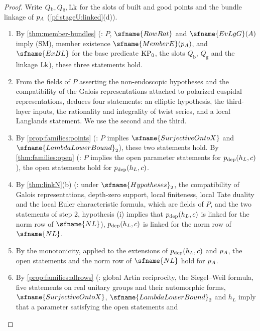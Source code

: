 \begin{proof}
Write $Q_{\mathrm b},Q_{\mathrm g},\mathrm{Lk}$ for the slots of built and good points and the bundle linkage of $p_{A}$
(\cref{pf:stageU:linked}(d)).
\begin{enumerate}[label=\arabic*.]
\item By \cref{thm:member-bundles} (: $P$,
$\sfname{RowRat}$ and $\sfname{EvLgG}(A)$ imply (SM), member existence $\sfname{MemberE}(\stageUpA)$, and $\sfname{ExBL}$
for the base predicate $\mathrm{KP}_0$, the slots $Q_{\mathrm b}$, $Q_{\mathrm g}$ and the linkage $\mathrm{Lk}$), these three
statements hold.
\item From the fields of $P$ asserting the non-endoscopic hypotheses and the compatibility of the Galois representations
attached to polarized cuspidal representations, 
deduces four statements: an elliptic hypothesis, the third-layer inputs, the rationality and integrality of twist series,
and a local Langlands statement. We use the second and the third.
\item By \cref{prop:families:points} (: $P$
implies $\sfname{SurjectiveOntoX}$ and $\sfname{LambdaLowerBound}_2$), these two statements hold. By
\cref{thm:families:open} (: $P$ implies the open parameter
statements for $p_{\mathrm{dep}}(h_L,c)$), the open statements hold for $p_{\mathrm{dep}}(h_L,c)$.
\item By \cref{thm:linkN}(b) (: under $\sfname{Hypotheses}_2$, the compatibility of
Galois representations, depth-zero support, local finiteness, local Tate duality and the local Euler characteristic formula,
which are fields of $P$, and the two statements of step 2, hypothesis (i) implies that $p_{\mathrm{dep}}(h_L,c)$ is linked for the
norm row of $\sfname{NL}$), $p_{\mathrm{dep}}(h_L,c)$ is linked for the norm row of $\sfname{NL}$.
\item By the monotonicity, applied to the extensions of $p_{\mathrm{dep}}(h_L,c)$ and $p_{A}$, the open statements and the norm
row of $\sfname{NL}$ hold for $p_{A}$.
\item By \cref{prop:families:allrows} (: global Artin
reciprocity, the Siegel--Weil formula, five statements on real unitary groups and their automorphic forms,
$\sfname{SurjectiveOntoX}$, $\sfname{LambdaLowerBound}_2$ and $h_L$ imply that a parameter satisfying the open statements and

\end{enumerate}
\end{proof}
